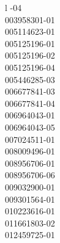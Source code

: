 \begin{deluxetable}{l}
\tablewidth{\linewidth}
-04 \\
 003958301-01 \\
 005114623-01 \\
 005125196-01 \\
 005125196-02 \\
 005125196-04 \\
 005446285-03 \\
 006677841-03 \\
 006677841-04 \\
 006964043-01 \\
 006964043-05 \\
 007024511-01 \\
 008009496-01 \\
 008956706-01 \\
 008956706-06 \\
 009032900-01 \\
 009301564-01 \\
 010223616-01 \\
 011661803-02 \\
 012459725-01 \\

\end{deluxetable}